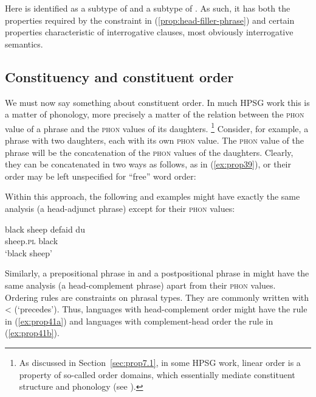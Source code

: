 \documentclass[output=paper
	        ,collection
	        ,collectionchapter
 	        ,biblatex
                ,babelshorthands
                ,newtxmath
                ,draftmode
                ,colorlinks, citecolor=brown
]{langscibook}
\begin{document}
Here  is identified as a subtype of  and a subtype of . As such, it has both the properties required by the constraint in (\ref{prop:head-filler-phrase}) and certain properties characteristic of interrogative clauses, most obviously interrogative semantics.

\subsection{Constituency and constituent order}\label{sec:prop5.2}

We must now say something about constituent order. In much HPSG work this is a matter of phonology, more precisely a matter of the relation between the \textsc{phon} value of a phrase and the \textsc{phon} values of its daughters.%
%
\footnote{As discussed in Section~\ref{sec:prop7.1}, in some HPSG work, linear order is a property of so-called order domains, which essentially mediate constituent structure and phonology (see ). }
%
Consider, for example, a phrase with two daughters, each with its own \textsc{phon} value. The \textsc{phon} value of the phrase will be the concatenation of the \textsc{phon} values of the daughters. Clearly, they can be concatenated in two ways as follows, as in (\ref{ex:prop39}), or their order may be left unspecified for ``free'' word order:

\eal
\label{ex:prop39}\label{ex-phon-concatenation}
\ex
{}
\ex
{}
\zl

\noindent
Within this approach, the following  and  examples might have exactly the same analysis (a head-adjunct phrase) except for their \textsc{phon} values:

\eal\label{ex:prop40}
\ex\label{ex:prop40a}
black sheep
\ex\label{ex:prop40b}
\gll defaid            du\\
     sheep.\textsc{pl} black\\
\glt `black sheep'
\zl

\noindent
Similarly, a prepositional phrase in  and a postpositional phrase in  might have the same analysis (a head-complement phrase) apart from their \textsc{phon} values. Ordering rules are constraints on phrasal types. They are commonly written with < (`precedes'). Thus, languages with head-complement order might have the rule in (\ref{ex:prop41a}) and languages with complement-head order the rule in (\ref{ex:prop41b}).
\end{document}
